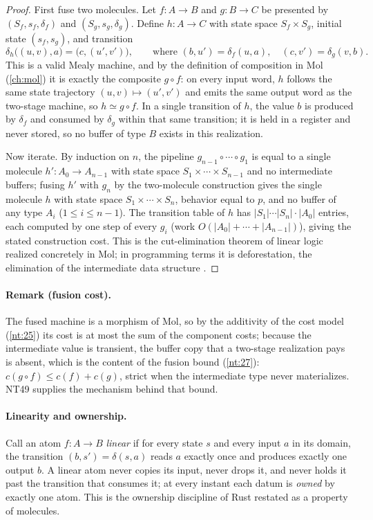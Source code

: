\begin{proof}
First fuse two molecules. Let $f : A \to B$ and $g : B \to C$ be presented by $(S_f, s_f, \delta_f)$ and $(S_g, s_g, \delta_g)$. Define $h : A \to C$ with state space $S_f \times S_g$, initial state $(s_f, s_g)$, and transition
\[
\delta_h\bigl((u, v), a\bigr) = \bigl(c, (u', v')\bigr),
\qquad \text{where } (b, u') = \delta_f(u, a), \quad (c, v') = \delta_g(v, b) .
\]
This is a valid Mealy machine, and by the definition of composition in Mol (\autoref{ch:mol}) it is exactly the composite $g \circ f$: on every input word, $h$ follows the same state trajectory $(u, v) \mapsto (u', v')$ and emits the same output word as the two-stage machine, so $h \simeq g \circ f$. In a single transition of $h$, the value $b$ is produced by $\delta_f$ and consumed by $\delta_g$ within that same transition; it is held in a register and never stored, so no buffer of type $B$ exists in this realization.

Now iterate. By induction on $n$, the pipeline $g_{n-1} \circ \cdots \circ g_1$ is equal to a single molecule $h' : A_0 \to A_{n-1}$ with state space $S_1 \times \cdots \times S_{n-1}$ and no intermediate buffers; fusing $h'$ with $g_n$ by the two-molecule construction gives the single molecule $h$ with state space $S_1 \times \cdots \times S_n$, behavior equal to $p$, and no buffer of any type $A_i$ ($1 \leq i \leq n-1$). The transition table of $h$ has $|S_1| \cdots |S_n| \cdot |A_0|$ entries, each computed by one step of every $g_i$ (work $O(|A_0| + \cdots + |A_{n-1}|)$), giving the stated construction cost. This is the cut-elimination theorem of linear logic \citep{girard} realized concretely in Mol; in programming terms it is deforestation, the elimination of the intermediate data structure \citep{wadler}.
\end{proof}

\paragraph{Remark (fusion cost).}
The fused machine is a morphism of Mol, so by the additivity of the cost model (\autoref{nt:25}) its cost is at most the sum of the component costs; because the intermediate value is transient, the buffer copy that a two-stage realization pays is absent, which is the content of the fusion bound (\autoref{nt:27}): $c(g \circ f) \leq c(f) + c(g)$, strict when the intermediate type never materializes. NT49 supplies the mechanism behind that bound.

\paragraph{Linearity and ownership.}
Call an atom $f : A \to B$ \emph{linear} if for every state $s$ and every input $a$ in its domain, the transition $(b, s') = \delta(s, a)$ reads $a$ exactly once and produces exactly one output $b$. A linear atom never copies its input, never drops it, and never holds it past the transition that consumes it; at every instant each datum is \emph{owned} by exactly one atom. This is the ownership discipline of Rust restated as a property of molecules.

